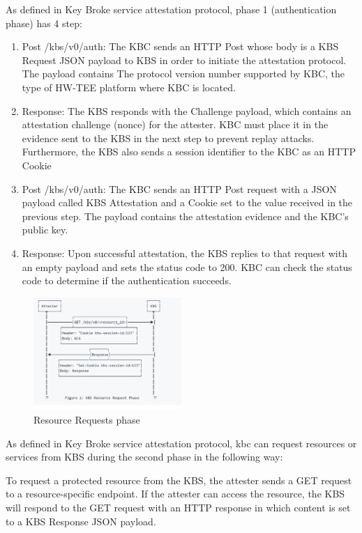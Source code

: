 As defined in Key Broke service attestation protocol, phase 1 (authentication phase) has 4 step: 
\begin{displayquote}
    \begin{enumerate}
        \item  Post /kbs/v0/auth: The KBC sends an HTTP Post whose body is a KBS Request JSON payload to KBS in order to initiate the attestation protocol. The payload contains The protocol version number supported by KBC, the type of HW-TEE platform where KBC is located.
        \item  Response: The KBS responds with the Challenge payload, which contains an attestation challenge (nonce) for the attester. KBC must place it in the evidence sent to the KBS in the next step to prevent replay attacks. Furthermore, the KBS also sends a session identifier to the KBC as an HTTP Cookie
        \item  Post /kbs/v0/auth: The KBC sends an HTTP Post request with a JSON payload called KBS Attestation and a Cookie set to the value received in the previous step. The payload contains the attestation evidence and the KBC’s public key.
        \item  Response: Upon successful attestation, the KBS replies to that request with an empty payload and sets the status code to 200. KBC can check the status code to determine if the authentication succeeds. 
    \end{enumerate}
\end{displayquote}

\begin{figure}[htp]
    \centering
    \includegraphics[width=0.5\textwidth]{images/resourcerequrie.PNG}
    \caption[Resource Requests phase]{Resource Requests phase}
    \label{fig:resourcerequrie}
\end{figure}
As defined in Key Broke service attestation protocol,  kbc can request resources or services from KBS during the second phase in the following way:
\begin{displayquote}
  To request a protected resource from the KBS, the attester sends a GET request to a resource-specific endpoint. If the attester can access the resource, the KBS will respond to the GET request with an HTTP response in which content is set to a KBS Response JSON payload.
\end{displayquote}


